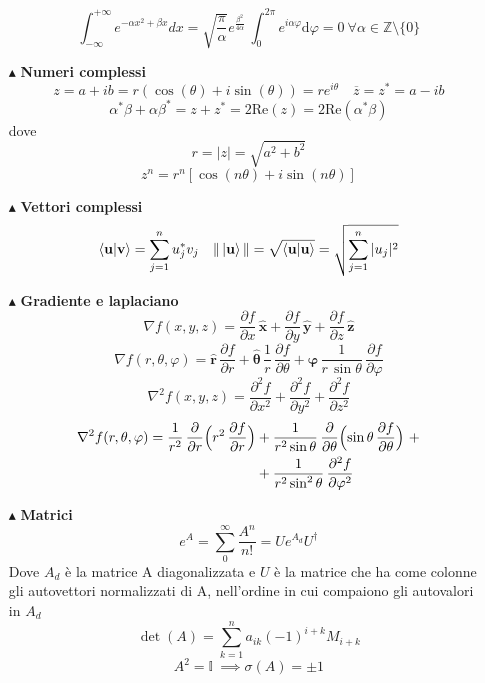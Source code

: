 \documentclass{book}
\newcommand{\g}{\textbf}
\newcommand{\e}{\begin{equation}}
\newcommand{\ex}{\end{equation} }
\begin{document}
\begin{multicols}{4}
\begin{itemize}
\e{\int_{-\infty}^{+\infty} e^{-\alpha x^2 + \beta x}  dx = \sqrt{\frac{\pi}{\alpha}}  e^{\frac{\beta^2}{4\alpha}} \ \int_{0}^{2\pi}e^{i\alpha \varphi}\text{d}\varphi = 0 \ \forall \alpha \in \mathbb{Z}\setminus \{0\}} \ex


        \item [$\blacktriangle$] \g{Numeri complessi}
        \e{z = a + ib = r(\cos(\theta) + i\sin(\theta)) = re^{i\theta} \quad \overline{z} = z^{*} = a - ib}\ex
        \e{\alpha^{*}\beta + \alpha\beta^{*} = z + z^{*} = 2\text{Re}(z) = 2\text{Re}(\alpha^{*}\beta)}\ex
        dove 
        \e{r = |z| = \sqrt{a^{2}+b^{2}} }\ex
        \e{z^n = r^n \left[ \cos(n\theta) + i\sin(n\theta) \right]}\ex
        \item [$\blacktriangle$] \g{Vettori complessi} 
        \e{\langle \mathbf{u} | \mathbf{v} \rangle = \sum_{j=1}^n u_j^* v_j \quad \|\ket{\mathbf{u}}\| = \sqrt{\langle \mathbf{u} | \mathbf{u} \rangle} = \sqrt{\sum_{j=1}^n |u_j|^2}
}\ex
\item [$\blacktriangle$] \g{Gradiente e laplaciano}
\begin{equation}
\nabla f(x,y,z) 
= \frac{\partial f}{\partial x}\,\hat{\mathbf{x}} 
+ \frac{\partial f}{\partial y}\,\hat{\mathbf{y}} 
+ \frac{\partial f}{\partial z}\,\hat{\mathbf{z}}
\end{equation}
\begin{equation}
\nabla f(r,\theta,\varphi)
= \hat{\mathbf{r}}\,\frac{\partial f}{\partial r}
+ \hat{\boldsymbol{\theta}}\,\frac{1}{r}\,\frac{\partial f}{\partial \theta} 
+ \hat{\boldsymbol{\varphi}}\,\frac{1}{r\,\sin\theta}\,\frac{\partial f}{\partial \varphi}
\end{equation}
\begin{equation}
\nabla^2 f(x,y,z)
= \frac{\partial^2 f}{\partial x^2}
+ \frac{\partial^2 f}{\partial y^2}
+ \frac{\partial^2 f}{\partial z^2}
\end{equation}
\begin{align}
    \nabla^2 f(r,\theta,\varphi)
= \frac{1}{r^2}\,\frac{\partial}{\partial r}
\Bigl(
  r^2 \,\frac{\partial f}{\partial r}
\Bigr)
& + \frac{1}{r^2 \sin\theta}\,\frac{\partial}{\partial \theta}
\Bigl(
  \sin\theta \,\frac{\partial f}{\partial \theta}
\Bigr)\ 
+\\
    & + \frac{1}{r^2 \sin^2\theta}\,\frac{\partial^2 f}{\partial \varphi^2}
\end{align}
\item [$\blacktriangle$] \g{Matrici}
\e{e^{A} = \sum_{0}^{\infty}\frac{A^{n}}{n!} = U e^{A_{d}}U^{\dagger}}\ex
Dove $A_{d}$ è la matrice A diagonalizzata e $U$ è la matrice che ha come colonne gli autovettori normalizzati di A, nell'ordine in cui compaiono gli autovalori in $A_{d}$
\begin{equation}
\det(A) = \sum_{k=1}^{n}a_{ik}(-1)^{i+k}M_{i+k}
\end{equation}
\e{A^{2} = \mathbb{I} \ \implies \sigma(A) = \pm 1}\ex


\end{itemize}
\end{multicols}
\end{document}
